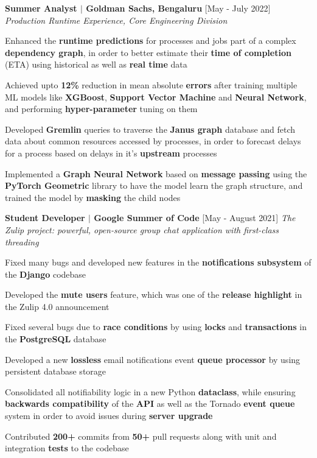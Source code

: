 \documentclass[11pt]{article}
\newcommand{\smallbullet}{
    \small$\bullet$
}
\newcommand{\bigblock}[3]{
    {
        \vspace*{5pt}
        \hspace*{-8pt} \large{\textbf{#1}} \hfill #2 \newline
        \textit{\textsf{#3}}
    }
}
\newenvironment{bullet-list-minor}{
    \begin{list}{
        \smallbullet
    }{
        \setlength\leftmargin{30pt}\topsep -5pt \itemsep -6pt
    }
} {
    \end{list}
}
\begin{document}
    \bigblock{
        Summer Analyst \(|\) Goldman Sachs, Bengaluru
    }{
        [May - July 2022]
    }{
        Production Runtime Experience, Core Engineering Division
    }
    \begin{bullet-list-minor}
        \item Enhanced the \textbf{runtime predictions} for processes and jobs part of a complex \textbf{dependency graph}, in order to better estimate their \textbf{time of completion} (ETA) using historical as well as \textbf{real time} data
        \item Achieved upto \textbf{12\%} reduction in mean absolute \textbf{errors} after
        training multiple ML models like \textbf{XGBoost}, \textbf{Support Vector Machine} and \textbf{Neural Network}, and performing \textbf{hyper-parameter} tuning on them
        \item Developed \textbf{Gremlin} queries to traverse the \textbf{Janus graph} database and fetch data about common resources accessed by processes, in order to forecast delays for a process based on delays in it's \textbf{upstream} processes
        \item Implemented a \textbf{Graph Neural Network} based on \textbf{message passing} using the \textbf{PyTorch Geometric} library to have the model learn the graph structure, and trained the model by \textbf{masking} the child nodes
    \end{bullet-list-minor}


    \bigblock{
        Student Developer \(|\) Google Summer of Code
    }{
        [May - August 2021]
    }{
        The Zulip project: powerful, open-source group chat application with first-class threading
    }
    \begin{bullet-list-minor}
        \item Fixed many bugs and developed new features in the \textbf{notifications subsystem} of the \textbf{Django} codebase
        \item Developed the \textbf{mute users} feature, which was one of the \textbf{release highlight} in the Zulip 4.0 announcement
        \item Fixed several bugs due to \textbf{race conditions} by using \textbf{locks} and \textbf{transactions} in the \textbf{PostgreSQL} database
        \item Developed a new \textbf{lossless} email notifications event \textbf{queue processor} by using persistent database storage
        \item Consolidated all notifiability logic in a new Python \textbf{dataclass}, while ensuring \textbf{backwards compatibility} of the \textbf{API} as well as the Tornado \textbf{event queue} system in order to avoid issues during \textbf{server upgrade}
        \item Contributed \textbf{200+} commits from \textbf{50+} pull requests along with unit and integration \textbf{tests} to the codebase
    \end{bullet-list-minor}
\end{document}
